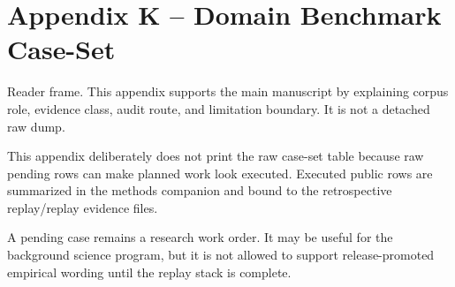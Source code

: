 \section{Appendix K -- Domain Benchmark Case-Set}
Reader frame. This appendix supports the main manuscript by explaining corpus role, evidence class, audit route, and limitation boundary. It is not a detached raw dump.


\label{sec:oc-core-1-3-domain-benchmark-caseset-summary}

This appendix deliberately does not print the raw case-set table because raw pending rows can make planned work look executed. Executed public rows are summarized in the methods companion and bound to the retrospective replay/replay evidence files.


A pending case remains a research work order. It may be useful for the background science program, but it is not allowed to support release-promoted empirical wording until the replay stack is complete.
